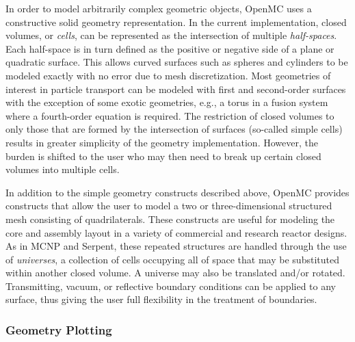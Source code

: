 \documentclass[5p,authoryear]{elsarticle}
\begin{document}
In order to model arbitrarily complex geometric objects, OpenMC uses a
constructive solid geometry representation. In the current implementation,
closed volumes, or \textit{cells}, can be represented as the intersection of
multiple \textit{half-spaces}. Each half-space is in turn defined as the
positive or negative side of a plane or quadratic surface. This allows curved
surfaces such as spheres and cylinders to be modeled exactly with no error due
to mesh discretization. Most geometries of interest in particle transport can be
modeled with first and second-order surfaces with the exception of some exotic
geometries, e.g., a torus in a fusion system where a fourth-order equation is
required. The restriction of closed volumes to only those that are formed by the
intersection of surfaces (so-called simple cells) results in greater simplicity
of the geometry implementation. However, the burden is shifted to the user who
may then need to break up certain closed volumes into multiple cells.

In addition to the simple geometry constructs described above, OpenMC provides
constructs that allow the user to model a two or three-dimensional structured
mesh consisting of quadrilaterals. These constructs are useful for modeling the
core and assembly layout in a variety of commercial and research reactor
designs. As in MCNP and Serpent, these repeated structures are handled through
the use of \textit{universes}, a collection of cells occupying all of space that
may be substituted within another closed volume. A universe may also be
translated and/or rotated. Transmitting, vacuum, or reflective boundary
conditions can be applied to any surface, thus giving the user full flexibility
in the treatment of boundaries.

\subsubsection{Geometry Plotting}
\end{document}
